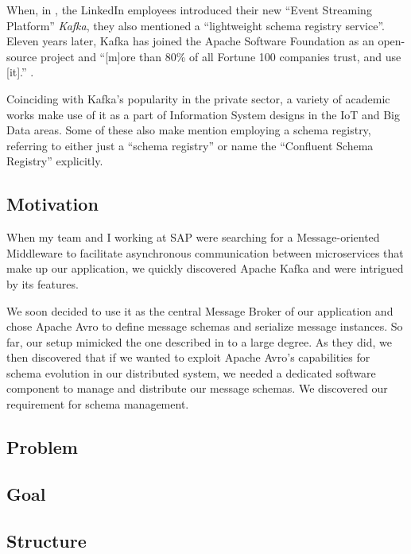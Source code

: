 
When, in \citeyear{kreps_kafka_2011}, the LinkedIn employees \citeauthor{kreps_kafka_2011} introduced their new \enquote{Event Streaming Platform} \emph{Kafka}, they also mentioned a \enquote{lightweight schema registry service}.
Eleven years later, Kafka has joined the Apache Software Foundation as an open-source project and \enquote{[m]ore than 80\% of all Fortune 100 companies trust, and use [it].} \parencite{noauthor_apache_nodate}.

Coinciding with Kafka's popularity in the private sector, a variety of academic works make use of it as a part of Information System designs in the IoT and Big Data areas.
Some of these also make mention employing a schema registry, referring to either just a \enquote{schema registry} or name the \enquote{Confluent Schema Registry} explicitly.

\subsection{Motivation}\label{sub-sec:motivation}

When my team and I working at SAP were searching for a Message-oriented Middleware to facilitate asynchronous communication between microservices that make up our application, we quickly discovered Apache Kafka and were intrigued by its features.

We soon decided to use it as the central Message Broker of our application and chose Apache Avro to define message schemas and serialize message instances.
So far, our setup mimicked the one described in \cite{kreps_kafka_2011} to a large degree.
As they did, we then discovered that if we wanted to exploit Apache Avro's capabilities for schema evolution in our distributed system, we needed a dedicated software component to manage and distribute our message schemas.
We discovered our requirement for schema management.

\subsection{Problem}

\subsection{Goal}

\subsection{Structure}

